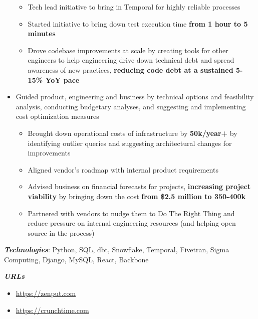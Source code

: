 \documentclass[a4paper]{article}
\newenvironment{jobdetails}%
    {\list{}{\leftmargin=4mm}\item[]}%
    {\endlist}
\begin{document}
\begin{jobdetails}
\begin{itemize}
\begin{itemize}
            \item Tech lead initiative to bring in Temporal for highly reliable processes
            \item Started initiative to bring down test execution time \textbf{from 1 hour to 5 minutes}
            \item Drove codebase improvements at scale by creating tools for other engineers to help engineering drive down technical debt and spread awareness of new practices, \textbf{reducing code debt at a sustained 5-15\% YoY pace}
        \end{itemize}
    \item Guided product, engineering and business by technical options and feasibility analysis, conducting budgetary analyses, and suggesting and implementing cost optimization measures
        \begin{itemize}
            \item Brought down operational costs of infrastructure by \textbf{50k/year+} by identifying outlier queries and suggesting architectural changes for improvements
            \item Aligned vendor's roadmap with internal product requirements
            \item Advised business on financial forecasts for projects, \textbf{increasing project viability} by bringing down the cost \textbf{from \$2.5 million to 350-400k}
            \item Partnered with vendors to nudge them to Do The Right Thing and reduce pressure on internal engineering resources (and helping open source in the process)
        \end{itemize}
\end{itemize}
\vspace{2mm}

\textbf{\textit{Technologies}}: Python, SQL, dbt, Snowflake, Temporal, Fivetran, Sigma Computing, Django, MySQL, React, Backbone

\textbf{\textit{URLs}}
\begin{itemize} \itemsep 1pt
	\item \url{https://zenput.com}
	\item \url{https://crunchtime.com}
\end{itemize}

\end{jobdetails}
\vspace{1mm}


\pagebreak


\end{document}
